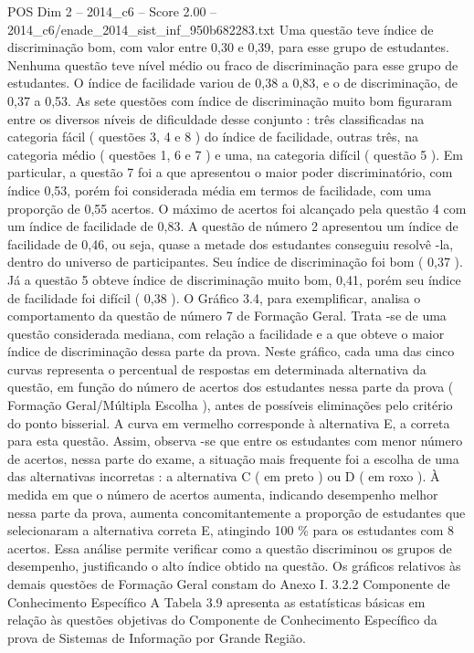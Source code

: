 \begin{textsample}{POS Dim 2 – 2014\_c6 – Score 2.00 – 2014\_c6/enade\_2014\_sist\_inf\_950b682283.txt}
Uma questão teve índice de discriminação bom, com valor entre 0,30 e 0,39, para esse grupo de estudantes.
Nenhuma questão teve nível médio ou fraco de discriminação para esse grupo de estudantes.
O índice de facilidade variou de 0,38 a 0,83, e o de discriminação, de 0,37 a 0,53.
As sete questões com índice de discriminação muito bom figuraram entre os diversos níveis de dificuldade desse conjunto : três classificadas na categoria fácil ( questões 3, 4 e 8 ) do índice de facilidade, outras três, na categoria médio ( questões 1, 6 e 7 ) e uma, na categoria difícil ( questão 5 ).
Em particular, a questão 7 foi a que apresentou o maior poder discriminatório, com índice 0,53, porém foi considerada média em termos de facilidade, com uma proporção de 0,55 acertos.
O máximo de acertos foi alcançado pela questão 4 com um índice de facilidade de 0,83.
A questão de número 2 apresentou um índice de facilidade de 0,46, ou seja, quase a metade dos estudantes conseguiu resolvê -la, dentro do universo de participantes.
Seu índice de discriminação foi bom ( 0,37 ).
Já a questão 5 obteve índice de discriminação muito bom, 0,41, porém seu índice de facilidade foi difícil ( 0,38 ).
O Gráfico 3.4, para exemplificar, analisa o comportamento da questão de número 7 de Formação Geral.
Trata -se de uma questão considerada mediana, com relação a facilidade e a que obteve o maior índice de discriminação dessa parte da prova.
Neste gráfico, cada uma das cinco curvas representa o percentual de respostas em determinada alternativa da questão, em função do número de acertos dos estudantes nessa parte da prova ( Formação Geral/Múltipla Escolha ), antes de possíveis eliminações pelo critério do ponto bisserial.
A curva em vermelho corresponde à alternativa E, a correta para esta questão.
Assim, observa -se que entre os estudantes com menor número de acertos, nessa parte do exame, a situação mais frequente foi a escolha de uma das alternativas incorretas : a alternativa C ( em preto ) ou D ( em roxo ).
À medida em que o número de acertos aumenta, indicando desempenho melhor nessa parte da prova, aumenta concomitantemente a proporção de estudantes que selecionaram a alternativa correta E, atingindo 100 \% para os estudantes com 8 acertos.
Essa análise permite verificar como a questão discriminou os grupos de desempenho, justificando o alto índice obtido na questão.
Os gráficos relativos às demais questões de Formação Geral constam do Anexo I. 3.2.2 Componente de Conhecimento Específico A Tabela 3.9 apresenta as estatísticas básicas em relação às questões objetivas do Componente de Conhecimento Específico da prova de Sistemas de Informação por Grande Região.

\end{textsample}
